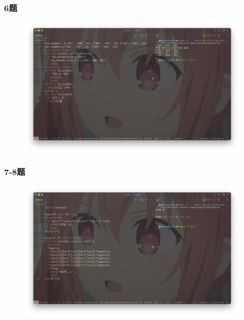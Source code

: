 \documentclass{beamer}
\begin{document}
  \begin{frame}[fragile]
    \frametitle{6题}
    \begin{figure}[!htb] %
      \includegraphics[width=1\textwidth,height=0.8\textheight]{./graph/python-trial-6.6.png} %
    \end{figure}
  \end{frame}
  \begin{frame}[fragile]
    \frametitle{7-8题}
    \begin{figure}[!htb] %
      \includegraphics[width=1\textwidth,height=0.8\textheight]{./graph/python-trial-6.7-6.8.png} %
    \end{figure}
  \end{frame}
\end{document}
